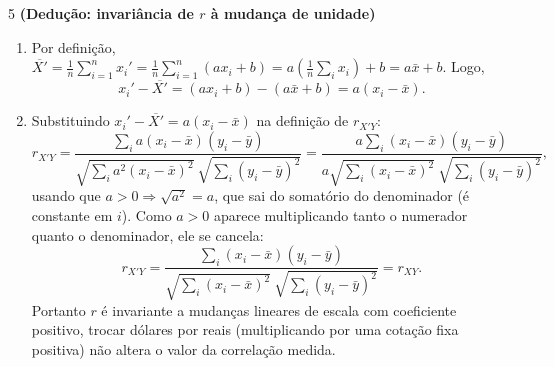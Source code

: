 \documentclass[11pt]{article}
\begin{document}
\begin{questao}{5} \textbf{(Dedução: invariância de $r$ à mudança de unidade)}
\begin{solucao}
\begin{enumerate}[label=(\alph*)]
  \item Por definição, $\overline{X'} = \frac{1}{n}\sum_{i=1}^n x_i' = \frac{1}{n}\sum_{i=1}^n
    (ax_i+b) = a\left(\frac{1}{n}\sum_i x_i\right) + b = a\bar x + b$. Logo,
    $$
    x_i' - \overline{X'} = (ax_i+b) - (a\bar x + b) = a(x_i-\bar x).
    $$
  \item Substituindo $x_i'-\overline{X'} = a(x_i-\bar x)$ na definição de $r_{X'Y}$:
    $$
    r_{X'Y} = \frac{\sum_i a(x_i-\bar x)(y_i-\bar y)}{\sqrt{\sum_i a^2(x_i-\bar x)^2}\ \sqrt{\sum_i (y_i-\bar y)^2}}
    = \frac{a\sum_i (x_i-\bar x)(y_i-\bar y)}{a\sqrt{\sum_i (x_i-\bar x)^2}\ \sqrt{\sum_i (y_i-\bar y)^2}},
    $$
    usando que $a>0 \Rightarrow \sqrt{a^2} = a$, que sai do somatório do denominador (é constante em
    $i$). Como $a>0$ aparece multiplicando tanto o numerador quanto o denominador, ele se cancela:
    $$
    r_{X'Y} = \frac{\sum_i (x_i-\bar x)(y_i-\bar y)}{\sqrt{\sum_i (x_i-\bar x)^2}\ \sqrt{\sum_i (y_i-\bar y)^2}} = r_{XY}.
    $$
    Portanto $r$ é invariante a mudanças lineares de escala com coeficiente positivo, trocar
    dólares por reais (multiplicando por uma cotação fixa positiva) não altera o valor da
    correlação medida.
\end{enumerate}
\end{solucao}
\end{questao}
\end{document}
